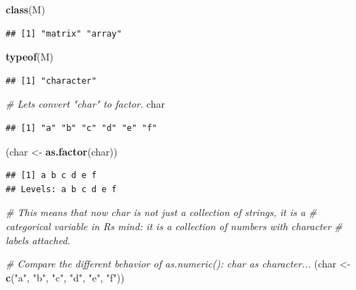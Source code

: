 \documentclass[
]{book}
\newenvironment{Shaded}{\begin{snugshade}}{\end{snugshade}}
\newcommand{\CommentTok}[1]{\textcolor[rgb]{0.56,0.35,0.01}{\textit{#1}}}
\newcommand{\FunctionTok}[1]{\textcolor[rgb]{0.13,0.29,0.53}{\textbf{#1}}}
\newcommand{\NormalTok}[1]{#1}
\newcommand{\OtherTok}[1]{\textcolor[rgb]{0.56,0.35,0.01}{#1}}
\newcommand{\StringTok}[1]{\textcolor[rgb]{0.31,0.60,0.02}{#1}}
\begin{document}
\begin{Shaded}
\begin{Highlighting}[]
\FunctionTok{class}\NormalTok{(M)}
\end{Highlighting}
\end{Shaded}

\begin{verbatim}
## [1] "matrix" "array"
\end{verbatim}

\begin{Shaded}
\begin{Highlighting}[]
\FunctionTok{typeof}\NormalTok{(M)}
\end{Highlighting}
\end{Shaded}

\begin{verbatim}
## [1] "character"
\end{verbatim}

\begin{Shaded}
\begin{Highlighting}[]
\CommentTok{\# Let\textquotesingle{}s convert "char" to factor.}
\NormalTok{char}
\end{Highlighting}
\end{Shaded}

\begin{verbatim}
## [1] "a" "b" "c" "d" "e" "f"
\end{verbatim}

\begin{Shaded}
\begin{Highlighting}[]
\NormalTok{(char }\OtherTok{\textless{}{-}} \FunctionTok{as.factor}\NormalTok{(char))}
\end{Highlighting}
\end{Shaded}

\begin{verbatim}
## [1] a b c d e f
## Levels: a b c d e f
\end{verbatim}

\begin{Shaded}
\begin{Highlighting}[]
\CommentTok{\# This means that now char is not just a collection of strings, it is a}
\CommentTok{\# categorical variable in R\textquotesingle{}s mind: it is a collection of numbers with character}
\CommentTok{\# labels attached.}

\CommentTok{\# Compare the different behavior of as.numeric(): char as character...}
\NormalTok{(char }\OtherTok{\textless{}{-}} \FunctionTok{c}\NormalTok{(}\StringTok{"a"}\NormalTok{, }\StringTok{"b"}\NormalTok{, }\StringTok{"c"}\NormalTok{, }\StringTok{"d"}\NormalTok{, }\StringTok{"e"}\NormalTok{, }\StringTok{"f"}\NormalTok{))}
\end{Highlighting}
\end{Shaded}
\end{document}
